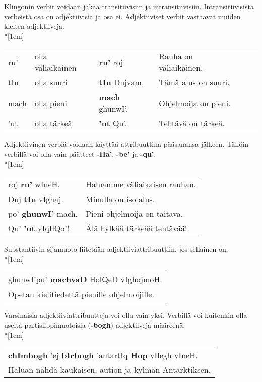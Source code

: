 \documentclass{book}
\begin{document}
Klingonin verbit voidaan jakaa transitiivisiin ja intransitiivisiin.
Intransitiivisista verbeistä osa on adjektiivisia ja osa ei.
Adjektiiviset verbit vastaavat muiden kielten adjektiiveja.
\\*[1em]
\begin{tabular}{Bl Il | l l}
    ru' & olla väliaikainen & \textbf{ru'} roj. & Rauha on väliaikainen. \\
    tIn & olla suuri & \textbf{tIn} Dujvam. & Tämä alus on suuri. \\
    mach & olla pieni & \textbf{mach} ghunwI'. & Ohjelmoija on pieni. \\
    'ut & olla tärkeä & \textbf{'ut} Qu'. & Tehtävä on tärkeä. \\
\end{tabular}

Adjektiivinen verbiä voidaan käyttää attribuuttina pääsanansa jälkeen.
Tällöin verbillä voi olla vain päätteet \textbf{-Ha'}, \textbf{-be'} ja \textbf{-qu'}.\\*[1em]
\begin{tabular}{l l}
    roj \textbf{ru'} wIneH. & Haluamme väliaikaisen rauhan. \\
    Duj \textbf{tIn} vIghaj. & Minulla on iso alus. \\
    po' \textbf{ghunwI'} mach. & Pieni ohjelmoija on taitava. \\
    Qu' \textbf{'ut} yIqIlQo'! & Älä hylkää tärkeää tehtävää! \\
\end{tabular}

Substantiivin sijamuoto liitetään adjektiiviattribuuttiin, jos sellainen on.\\*[1em]
\begin{tabular}{l}
    ghunwI'pu' \textbf{machvaD} HolQeD vIghojmoH. \\
    Opetan kielitiedettä pienille ohjelmoijille. \\ 
\end{tabular}

Varsinaisia adjektiiviattribuutteja voi olla vain yksi. Verbillä voi kuitenkin olla useita partisiippimuotoisia (\textbf{-bogh}) adjektiiveja määreenä.\\*[1em]
\begin{tabular}{l}
    \textbf{chImbogh} 'ej \textbf{bIrbogh} 'antartIq \textbf{Hop} vIlegh vIneH. \\
    Haluan nähdä kaukaisen, aution ja kylmän Antarktiksen. \\
\end{tabular}
\end{document}
